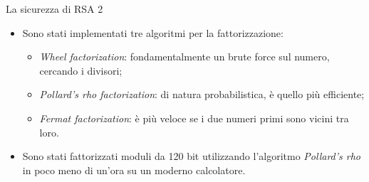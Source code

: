 \documentclass[11pt,svgnames,smaller,aspectratio=169,italian]{beamer}
\begin{document}
\begin{frame}{La sicurezza di RSA 2} %
	\begin{itemize}
		\item Sono stati implementati tre algoritmi per la fattorizzazione:
			\begin{itemize}
				\item \emph{Wheel factorization}: fondamentalmente un brute force sul numero, cercando i divisori;
				\item \emph{Pollard's rho factorization}: di natura probabilistica, è quello più efficiente;
				\item \emph{Fermat factorization}: è più veloce se i due numeri primi sono vicini tra loro.
			\end{itemize}
		\item Sono stati fattorizzati moduli da 120 bit utilizzando l'algoritmo \emph{Pollard's rho} in poco meno di un'ora su un moderno calcolatore.
	\end{itemize}
\end{frame}
\end{document}
